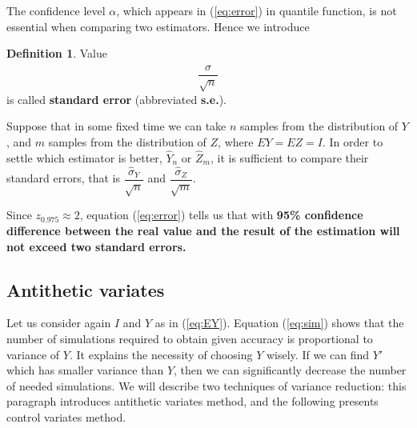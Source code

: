 \documentclass[a4paper,11pt, twoside]{book}
\theoremstyle{definition}
\newtheorem{mydef}{Definition}[chapter]
\theoremstyle{remark}
\begin{document}
The confidence level $\alpha$, which appears in (\ref{eq:error}) in quantile function, is not essential when comparing two estimators. Hence we introduce 
\begin{mydef}
 Value
 \begin{equation}
  \label{eq:stderr}
  \frac{\hat{\sigma}}{\sqrt{n}}
 \end{equation}
is called \textbf{standard error} (abbreviated \textbf{s.e.}).
\end{mydef}
Suppose that in some fixed time we can take $n$ samples from the distribution of $Y$, and $m$ samples from the distribution of $Z$, where $EY = EZ = I$. In order to settle which estimator is better, $\hat{Y}_n$ or $\hat{Z}_m$, it is sufficient to compare their standard errors, that is $\dfrac{\hat{\sigma}_Y}{\sqrt{n}}$ and $\dfrac{\hat{\sigma}_Z}{\sqrt{m}}$.

Since $z_{0.975} \approx 2$, equation (\ref{eq:error}) tells us that with \textbf{95\% confidence difference between the real value and the result of the estimation will not exceed two standard errors.}

\subsection{Antithetic variates}
Let us consider again $I$ and $Y$ as in (\ref{eq:EY}). Equation (\ref{eq:sim}) shows that the number of simulations required to obtain given accuracy is proportional to variance of $Y$. It explains the necessity of choosing $Y$ wisely. If we can find $Y'$ which has smaller variance than $Y$, then we can significantly decrease the number of needed simulations.
We will describe two techniques of variance reduction: this paragraph introduces antithetic variates method, and the following presents control variates method.
\end{document}
